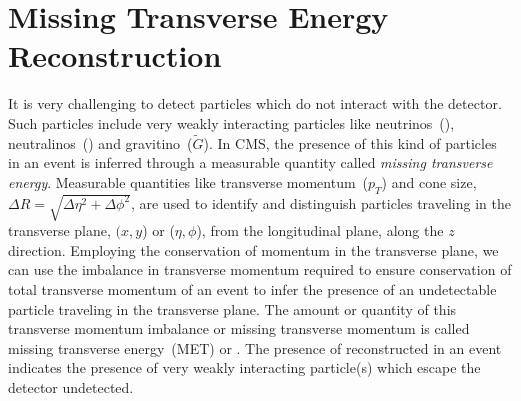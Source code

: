 
\section{Missing Transverse Energy Reconstruction}
It is very challenging to detect particles which do not interact with the detector. Such particles include very weakly interacting particles like neutrinos~(\Pneutrino), neutralinos~(\PSneutralinoOne) and gravitino~($\tilde{G}$). In CMS, the presence of this kind of particles in an event is inferred through a measurable quantity called \textit{missing transverse energy}. Measurable quantities like transverse momentum~($p_{T}$) and cone size, $\Delta R = \sqrt{ \Delta\eta^{2} + \Delta\phi^{2} }$, are used to identify and distinguish particles traveling in the transverse plane, $(x,y$) or ($\eta,\phi$), from the longitudinal plane, along the $z$ direction. Employing the conservation of momentum in the transverse plane, we can use the imbalance in transverse momentum required to ensure conservation of total transverse momentum of an event to infer the presence of an undetectable particle traveling in the transverse plane. The amount or quantity of this transverse momentum imbalance or missing transverse momentum is called missing transverse energy~(MET) or \MET. The presence of reconstructed \MET in an event indicates the presence of very weakly interacting particle(s) which escape the detector undetected.
